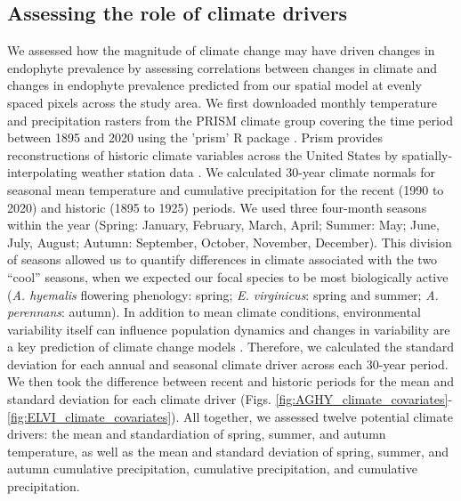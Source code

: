 \documentclass[11pt]{article}
\let\cite\citep
\begin{document}
\subsection*{Assessing the role of climate drivers}
We assessed how the magnitude of climate change may have driven changes in endophyte prevalence by assessing correlations between changes in climate and changes in endophyte prevalence predicted from our spatial model at evenly spaced pixels across the study area.
We first downloaded monthly temperature and precipitation rasters from the PRISM climate group \citep{daly2013prism} covering the time period between 1895 and 2020 using the 'prism' R package \citep{Rprism2015}. 
Prism provides reconstructions of historic climate variables across the United States by spatially-interpolating weather station data \citep{diLuzio2008constructing}. 
We calculated 30-year climate normals for seasonal mean temperature and cumulative precipitation for the recent (1990 to 2020) and historic (1895 to 1925) periods.
We used three four-month seasons within the year (Spring: January, February, March, April; Summer: May; June, July, August; Autumn: September, October, November, December). 
This division of seasons allowed us to quantify differences in climate associated with the two ``cool'' seasons, when we expected our focal species to be most biologically active (\emph{A. hyemalis} flowering phenology: spring; \emph{E. virginicus}: spring and summer; \emph{A. perennans}: autumn). 
In addition to mean climate conditions, environmental variability itself can influence population dynamics \cite{tuljapurkar_population_1982} and changes in variability are a key prediction of climate change models \cite{stocker2013technical, ipcc_2021}.
Therefore, we calculated the standard deviation for each annual and seasonal climate driver across each 30-year period.
We then took the difference between recent and historic periods for the mean and standard deviation for each climate driver (Figs. \ref{fig:AGHY_climate_covariates}-\ref{fig:ELVI_climate_covariates}).
All together, we assessed twelve potential climate drivers: the mean and standardiation of spring, summer, and autumn temperature, as well as the mean and standard deviation of spring, summer, and autumn cumulative precipitation, cumulative precipitation, and cumulative precipitation.
\end{document}
